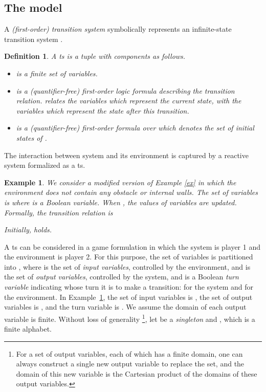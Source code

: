 \documentclass[letterpaper, 10 pt, conference]{ieeeconf}
\newtheorem{definition}{Definition}
\newtheorem{example}{Example}
\begin{document}
\subsection{The model}
\label{subsec:model}
A \emph{(first-order) transition system} symbolically represents an
infinite-state transition system \cite{cimatti2012smt}.
\begin{definition}
A \ac{ts}  is a tuple  with components as follows.
\begin{itemize}
\item  is a finite set of variables. 

\item  is a (quantifier-free) first-order logic formula describing the
  transition relation.  relates the variables
   which represent the \emph{current} state, with the
  variables  which represent the state after this
  transition.
 
\item  is a (quantifier-free) first-order formula over 
  which denotes the set of initial states  of
  . \end{itemize}
\end{definition}


The interaction between system and its environment is captured by a
reactive system formalized as a \ac{ts}.  
  \begin{example}
\label{ex2}
    We consider a modified version of Example \ref{ex} in which the
    environment does not contain any obstacle or internal walls.
    The set of variables is  where  is a
    Boolean variable. When , the values of variables  
    are updated. Formally,  the transition relation is



Initially,  holds.
  \end{example}
  A \ac{ts} can be considered in a game formulation in which the
  system is player 1 and the environment is player 2. For this
  purpose, the set of variables  is partitioned into , where  is the set of \emph{input variables},
  controlled by the environment, and  is the set of
  \emph{output variables}, controlled by the system, and  is a
  Boolean \emph{turn variable} indicating whose turn it is to make a transition:
   for the system and  for the environment.  In
  Example~\ref{ex2}, the set of input variables is , the
  set of output variables is , and the turn variable is
  .  We assume the domain of each output variable
  is finite. Without loss of generality \footnote{For a set of output
    variables, each of which has a finite domain, one can always
    construct a single new output variable to replace the set, and the
    domain of this new variable is the Cartesian product of the
    domains of these output variables.}, let  be a
  \emph{singleton}  and , which is a finite
  alphabet.
\end{document}
